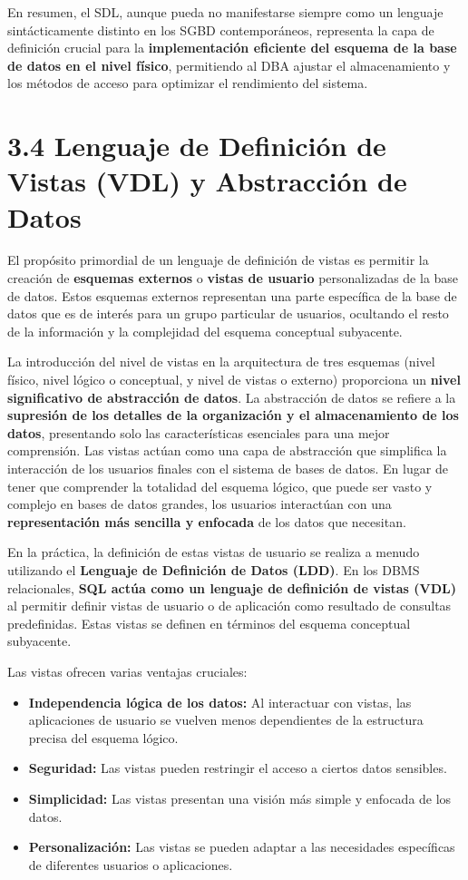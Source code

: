En resumen, el SDL, aunque pueda no manifestarse siempre como un lenguaje sintácticamente distinto en los SGBD contemporáneos, representa la capa de definición crucial para la \textbf{implementación eficiente del esquema de la base de datos en el nivel físico}, permitiendo al DBA ajustar el almacenamiento y los métodos de acceso para optimizar el rendimiento del sistema.

\section{3.4 Lenguaje de Definición de Vistas (VDL) y Abstracción de Datos}

El propósito primordial de un lenguaje de definición de vistas es permitir la creación de \textbf{esquemas externos} o \textbf{vistas de usuario} personalizadas de la base de datos. Estos esquemas externos representan una parte específica de la base de datos que es de interés para un grupo particular de usuarios, ocultando el resto de la información y la complejidad del esquema conceptual subyacente.

La introducción del nivel de vistas en la arquitectura de tres esquemas (nivel físico, nivel lógico o conceptual, y nivel de vistas o externo) proporciona un \textbf{nivel significativo de abstracción de datos}. La abstracción de datos se refiere a la \textbf{supresión de los detalles de la organización y el almacenamiento de los datos}, presentando solo las características esenciales para una mejor comprensión. Las vistas actúan como una capa de abstracción que simplifica la interacción de los usuarios finales con el sistema de bases de datos. En lugar de tener que comprender la totalidad del esquema lógico, que puede ser vasto y complejo en bases de datos grandes, los usuarios interactúan con una \textbf{representación más sencilla y enfocada} de los datos que necesitan.

En la práctica, la definición de estas vistas de usuario se realiza a menudo utilizando el \textbf{Lenguaje de Definición de Datos (LDD)}. En los DBMS relacionales, \textbf{SQL actúa como un lenguaje de definición de vistas (VDL)} al permitir definir vistas de usuario o de aplicación como resultado de consultas predefinidas. Estas vistas se definen en términos del esquema conceptual subyacente.

Las vistas ofrecen varias ventajas cruciales:

\begin{itemize}
    \item \textbf{Independencia lógica de los datos:} Al interactuar con vistas, las aplicaciones de usuario se vuelven menos dependientes de la estructura precisa del esquema lógico.
    \item \textbf{Seguridad:} Las vistas pueden restringir el acceso a ciertos datos sensibles.
    \item \textbf{Simplicidad:} Las vistas presentan una visión más simple y enfocada de los datos.
    \item \textbf{Personalización:} Las vistas se pueden adaptar a las necesidades específicas de diferentes usuarios o aplicaciones.
\end{itemize}

